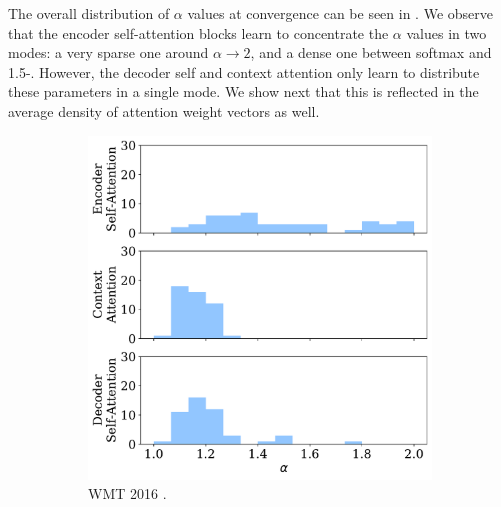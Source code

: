 The overall distribution of $\alpha$ values at convergence can be
seen in . We observe that the encoder
self-attention blocks learn to concentrate the $\alpha$ values in two
modes: a very sparse one around $\alpha \rightarrow 2$, and a dense
one between softmax and 1.5-\entmaxtext{}. However, the decoder self
and context attention only learn to distribute these parameters in a
single mode. We show next that this is reflected in the average
density of attention weight vectors as well.

\begin{figure}[!htbp]
    \centering
    \begin{subfigure}[b]{.49\linewidth}
        \includegraphics[width=\linewidth]{Figures/hist_alphas_ro.pdf}
        \caption{%
            \label{fig:hist_alphas_ro}%
            WMT 2016 .}
    \end{subfigure}
    \begin{subfigure}[b]{.49\linewidth}

\end{subfigure}
\end{figure}
